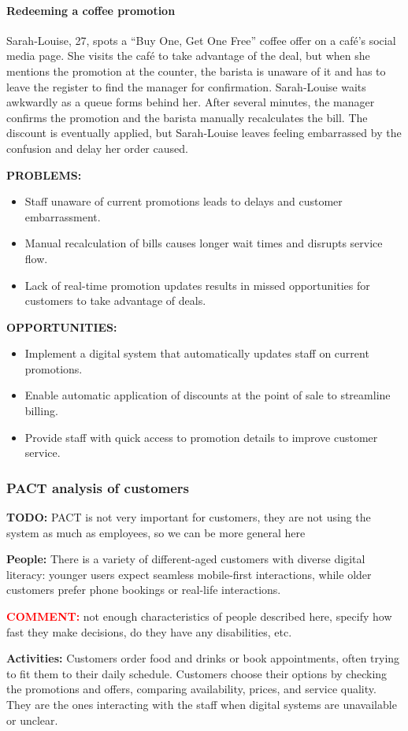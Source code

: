 \documentclass[]{VUMIFTemplateClass}
\newcommand{\yellowcomment}[1]{%
    \begin{tcolorbox}[colback=yellow!80, colframe=yellow!80, arc=0pt, outer arc=0pt, boxrule=0pt, left=3pt, right=3pt, top=3pt, bottom=3pt]
        \textbf{\textcolor{red}{COMMENT:}} #1
    \end{tcolorbox}
}
\newcommand{\todocomment}[1]{%
    \begin{tcolorbox}[colback=red!20, colframe=red!60, arc=0pt, outer arc=0pt, boxrule=1pt, left=3pt, right=3pt, top=3pt, bottom=3pt]
        \textbf{\textcolor{orange!70!black}{TODO:}} #1
    \end{tcolorbox}
}
\newcommand{\subsubsubsection}[1]{\paragraph{#1}}
\begin{document}
\subsubsubsection{Redeeming a coffee promotion}


Sarah‑Louise, 27, spots a “Buy One, Get One Free” coffee offer on a café’s
social media page. She visits the café to take advantage of the deal, but when
she mentions the promotion at the counter, the barista is unaware of it and has
to leave the register to find the manager for confirmation. Sarah‑Louise waits
awkwardly as a queue forms behind her. After several minutes, the manager
confirms the promotion and the barista manually recalculates the bill. The
discount is eventually applied, but Sarah‑Louise leaves feeling embarrassed by
the confusion and delay her order caused.

\textbf{PROBLEMS:}
\begin{itemize}
    \item Staff unaware of current promotions leads to delays and customer embarrassment.
    \item Manual recalculation of bills causes longer wait times and disrupts service flow.
    \item Lack of real-time promotion updates results in missed opportunities for customers to take advantage of deals.
\end{itemize}
\textbf{OPPORTUNITIES:}
\begin{itemize}
    \item Implement a digital system that automatically updates staff on current promotions.
    \item Enable automatic application of discounts at the point of sale to streamline billing.
    \item Provide staff with quick access to promotion details to improve customer service.
\end{itemize}

\subsubsection{PACT analysis of customers}
\todocomment{PACT is not very important for customers, they are not using the system as much as employees, so we can be more general here}
\textbf{People:} There is a variety of different-aged customers with diverse
digital literacy: younger users expect seamless mobile-first interactions, while
older customers prefer phone bookings or real-life interactions. 
\yellowcomment{not enough characteristics of people described here, specify how fast they make decisions, do they have any disabilities, etc. }

\textbf{Activities:} Customers order food and drinks or book appointments, often
trying to fit them to their daily schedule. Customers choose their options by
checking the promotions and offers, comparing availability, prices, and service
quality. They are the ones interacting with the staff when digital systems are
unavailable or unclear.
\end{document}
